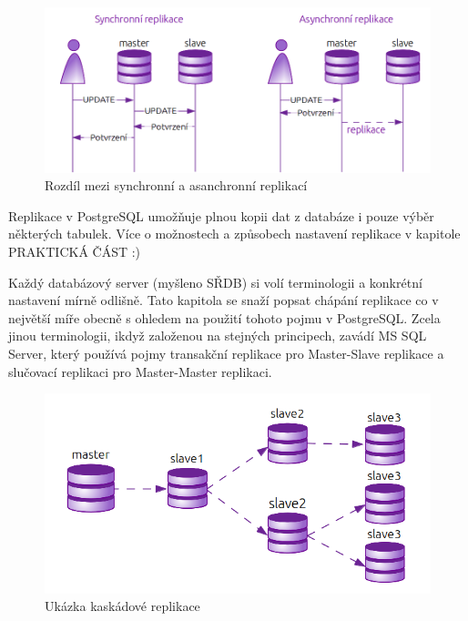         \begin{figure}[H]
          \centering
          \includegraphics[scale=1]{../../../grafy/obr/schema_asyncSync.png}
          \caption {Rozdíl mezi synchronní a asanchronní replikací}
        \end{figure}

        Replikace v PostgreSQL umožňuje plnou kopii dat z databáze i pouze
        výběr některých tabulek. Více o možnostech a způsobech nastavení
        replikace v kapitole PRAKTICKÁ ČÁST :)

        Každý databázový server (myšleno SŘDB) si volí terminologii a konkrétní
        nastavení mírně odlišně. Tato kapitola se snaží popsat chápání
        replikace co v největší míře obecně s ohledem na použití tohoto pojmu v
        PostgreSQL. Zcela jinou terminologii, ikdyž založenou na stejných
        principech, zavádí MS SQL Server, který používá pojmy transakční
        replikace pro Master-Slave replikace a slučovací replikaci pro
        Master-Master replikaci. 

          \begin{figure}[H]
            \centering
            \includegraphics[scale=1]{../../../grafy/obr/schema_kaskadova.png}
            \caption{Ukázka kaskádové replikace}
            \label{srovnaniM-M-S}
          \end{figure}

